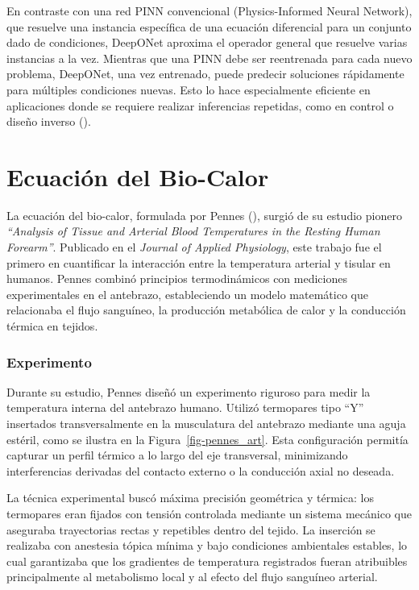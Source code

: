 \documentclass[
  spanish,
  us-letterpaper,
]{scrreprt}
\theoremstyle{definition}
\theoremstyle{plain}
\theoremstyle{remark}
\begin{document}
En contraste con una red PINN convencional (Physics-Informed Neural
Network), que resuelve una instancia específica de una ecuación
diferencial para un conjunto dado de condiciones, DeepONet aproxima el
operador general que resuelve varias instancias a la vez. Mientras que
una PINN debe ser reentrenada para cada nuevo problema, DeepONet, una
vez entrenado, puede predecir soluciones rápidamente para múltiples
condiciones nuevas. Esto lo hace especialmente eficiente en aplicaciones
donde se requiere realizar inferencias repetidas, como en control o
diseño inverso ().

\part{Ecuación del Bio-Calor}

La ecuación del bio-calor, formulada por Pennes
(), surgió de su estudio pionero
\emph{``Analysis of Tissue and Arterial Blood Temperatures in the
Resting Human Forearm''}. Publicado en el \emph{Journal of Applied
Physiology}, este trabajo fue el primero en cuantificar la interacción
entre la temperatura arterial y tisular en humanos. Pennes combinó
principios termodinámicos con mediciones experimentales en el antebrazo,
estableciendo un modelo matemático que relacionaba el flujo sanguíneo,
la producción metabólica de calor y la conducción térmica en tejidos.

\section*{Experimento}\label{experimento}


Durante su estudio, Pennes diseñó un experimento riguroso para medir la
temperatura interna del antebrazo humano. Utilizó termopares tipo ``Y''
insertados transversalmente en la musculatura del antebrazo mediante una
aguja estéril, como se ilustra en la Figura~\ref{fig-pennes_art}. Esta
configuración permitía capturar un perfil térmico a lo largo del eje
transversal, minimizando interferencias derivadas del contacto externo o
la conducción axial no deseada.

La técnica experimental buscó máxima precisión geométrica y térmica: los
termopares eran fijados con tensión controlada mediante un sistema
mecánico que aseguraba trayectorias rectas y repetibles dentro del
tejido. La inserción se realizaba con anestesia tópica mínima y bajo
condiciones ambientales estables, lo cual garantizaba que los gradientes
de temperatura registrados fueran atribuibles principalmente al
metabolismo local y al efecto del flujo sanguíneo arterial.
\end{document}
